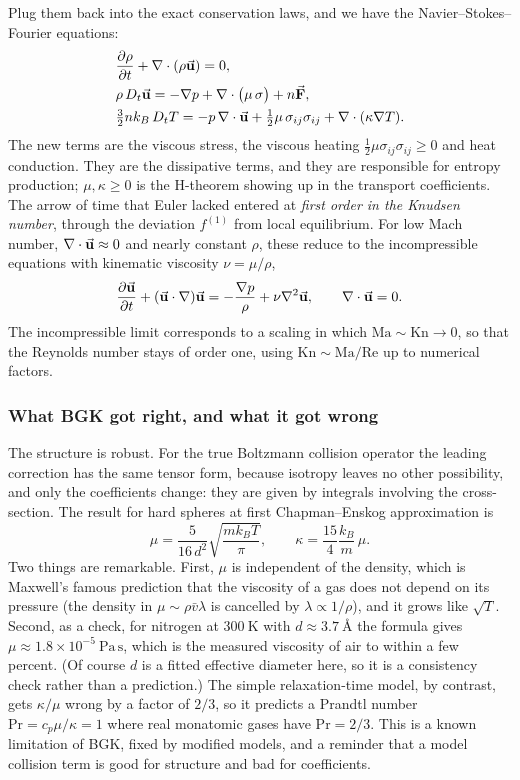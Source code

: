 Plug them back into the exact conservation laws, and we have the Navier--Stokes--Fourier equations:
\begin{align*}
&\pdv{\rho}{t}+\nabla\cdot(\rho\va u)=0,\\
&\rho\,D_t\va u=-\nabla p+\nabla\cdot\big(\mu\,\sigma\big)+n\va F,\\
&\tfrac32nk_B\,D_tT=-p\,\nabla\cdot\va u+\tfrac12\mu\,\sigma_{ij}\sigma_{ij}+\nabla\cdot(\kappa\nabla T).
\end{align*}
The new terms are the viscous stress, the viscous heating $\tfrac12\mu\sigma_{ij}\sigma_{ij}\ge0$ and heat conduction. They are the dissipative terms, and they are responsible for entropy production; $\mu,\kappa\ge0$ is the H-theorem showing up in the transport coefficients. The arrow of time that Euler lacked entered at \emph{first order in the Knudsen number}, through the deviation $f^{(1)}$ from local equilibrium. For low Mach number, $\nabla\cdot\va u\approx0$ and nearly constant $\rho$, these reduce to the incompressible equations with kinematic viscosity $\nu=\mu/\rho$,
\[
\pdv{\va u}{t}+(\va u\cdot\nabla)\va u=-\frac{\nabla p}{\rho}+\nu\nabla^2\va u,\qquad\nabla\cdot\va u=0 .
\]
The incompressible limit corresponds to a scaling in which $\mathrm{Ma}\sim\mathrm{Kn}\to0$, so that the Reynolds number stays of order one, using $\mathrm{Kn}\sim\mathrm{Ma}/\mathrm{Re}$ up to numerical factors.

\subsubsection*{What BGK got right, and what it got wrong}

The structure is robust. For the true Boltzmann collision operator the leading correction has the same tensor form, because isotropy leaves no other possibility, and only the coefficients change: they are given by integrals involving the cross-section. The result for hard spheres at first Chapman--Enskog approximation is
\[
\mu=\frac{5}{16\,d^2}\sqrt{\frac{m k_BT}{\pi}},\qquad \kappa=\frac{15}{4}\frac{k_B}{m}\,\mu .
\]
Two things are remarkable. First, $\mu$ is independent of the density, which is Maxwell's famous prediction that the viscosity of a gas does not depend on its pressure (the density in $\mu\sim\rho\bar v\lambda$ is cancelled by $\lambda\propto1/\rho$), and it grows like $\sqrt T$. Second, as a check, for nitrogen at $300\ \mathrm{K}$ with $d\approx3.7\ \mbox{\AA}$ the formula gives $\mu\approx1.8\times10^{-5}\ \mathrm{Pa\,s}$, which is the measured viscosity of air to within a few percent. (Of course $d$ is a fitted effective diameter here, so it is a consistency check rather than a prediction.) The simple relaxation-time model, by contrast, gets $\kappa/\mu$ wrong by a factor of $2/3$, so it predicts a Prandtl number $\mathrm{Pr}=c_p\mu/\kappa=1$ where real monatomic gases have $\mathrm{Pr}=2/3$. This is a known limitation of BGK, fixed by modified models, and a reminder that a model collision term is good for structure and bad for coefficients.


